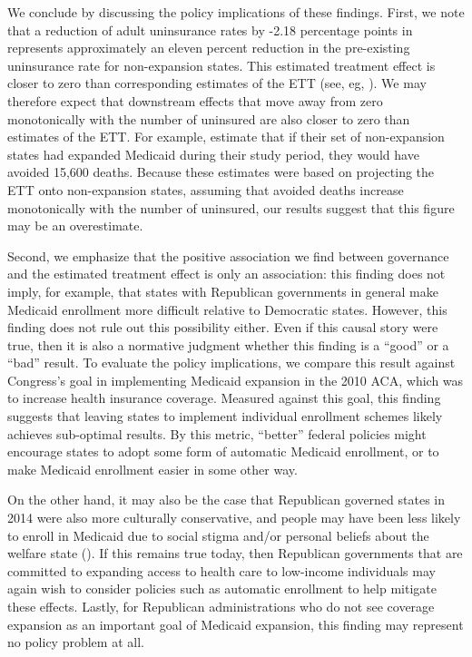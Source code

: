 \documentclass[12pt]{article}
\begin{document}
We conclude by discussing the policy implications of these findings. First, we note that a reduction of adult uninsurance rates by -2.18 percentage points in represents approximately an eleven percent reduction in the pre-existing uninsurance rate for non-expansion states. This estimated treatment effect is closer to zero than corresponding estimates of the ETT (see, eg, \cite{courtemanche2017early}). We may therefore expect that downstream effects that move away from zero monotonically with the number of uninsured are also closer to zero than estimates of the ETT. For example, \cite{miller2019medicaid} estimate that if their set of non-expansion states had expanded Medicaid during their study period, they would have avoided 15,600 deaths. Because these estimates were based on projecting the ETT onto non-expansion states, assuming that avoided deaths increase monotonically with the number of uninsured, our results suggest that this figure may be an overestimate.

Second, we emphasize that the positive association we find between governance and the estimated treatment effect is only an association: this finding does not imply, for example, that states with Republican governments in general make Medicaid enrollment more difficult relative to Democratic states. However, this finding does not rule out this possibility either. Even if this causal story were true, then it is also a normative judgment whether this finding is a ``good'' or a ``bad'' result. To evaluate the policy implications, we compare this result against Congress's goal in implementing Medicaid expansion in the 2010 ACA, which was to increase health insurance coverage. Measured against this goal, this finding suggests that leaving states to implement individual enrollment schemes likely achieves sub-optimal results. By this metric, ``better'' federal policies might encourage states to adopt some form of automatic Medicaid enrollment, or to make Medicaid enrollment easier in some other way.

On the other hand, it may also be the case that Republican governed states in 2014 were also more culturally conservative, and people may have been less likely to enroll in Medicaid due to social stigma and/or personal beliefs about the welfare state (\cite{sommers2012understanding}). If this remains true today, then Republican governments that are committed to expanding access to health care to low-income individuals may again wish to consider policies such as automatic enrollment to help mitigate these effects. Lastly, for Republican administrations who do not see coverage expansion as an important goal of Medicaid expansion, this finding may represent no policy problem at all.
\end{document}
